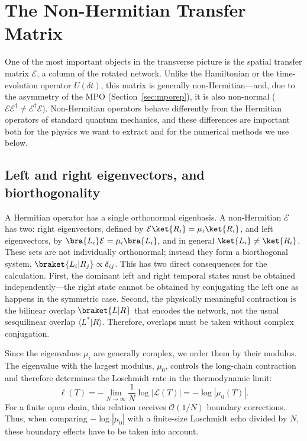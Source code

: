 \section{The Non-Hermitian Transfer Matrix}
\label{sec:nonhermitian}

One of the most important objects in the transverse picture is the spatial transfer matrix $\mathcal{E}$, a column of the rotated network. Unlike the Hamiltonian or the time-evolution operator $U(\delta t)$, this matrix is generally non-Hermitian---and, due to the asymmetry of the MPO (Section~\ref{sec:mporep}), it is also non-normal ($\mathcal{E}\mathcal{E}^\dagger\neq\mathcal{E}^\dagger\mathcal{E}$). Non-Hermitian operators behave differently from the Hermitian operators of standard quantum mechanics, and these differences are important both for the physics we want to extract and for the numerical methods we use below.

\subsection{Left and right eigenvectors, and biorthogonality}

A Hermitian operator has a single orthonormal eigenbasis. A non-Hermitian $\mathcal{E}$ has two: right eigenvectors, defined by $\mathcal{E}\ket{R_i}=\mu_i\ket{R_i}$, and left eigenvectors, by $\bra{L_i}\mathcal{E}=\mu_i\bra{L_i}$, and in general $\ket{L_i}\neq\ket{R_i}$. These sets are not individually orthonormal; instead they form a biorthogonal system, $\braket{L_i|R_j}\propto\delta_{ij}$. This has two direct consequences for the calculation. First, the dominant left and right temporal states must be obtained independently---the right state cannot be obtained by conjugating the left one as happens in the symmetric case. Second, the physically meaningful contraction is the bilinear overlap $\braket{L|R}$ that encodes the network, not the usual sesquilinear overlap $\langle L^*|R\rangle$. Therefore, overlaps must be taken without complex conjugation.

Since the eigenvalues $\mu_i$ are generally complex, we order them by their modulus. The eigenvalue with the largest modulus, $\mu_0$, controls the long-chain contraction and therefore determines the Loschmidt rate in the thermodynamic limit:
\begin{equation}
    \ell(T) = -\lim_{N\to\infty}\frac{1}{N}\log|\mathcal{L}(T)|
            = -\log|\mu_0(T)|.
    \label{eq:rate}
\end{equation}
For a finite open chain, this relation receives $\mathcal{O}(1/N)$ boundary corrections. Thus, when comparing $-\log|\mu_0|$ with a finite-size Loschmidt echo divided by $N$, these boundary effects have to be taken into account.

